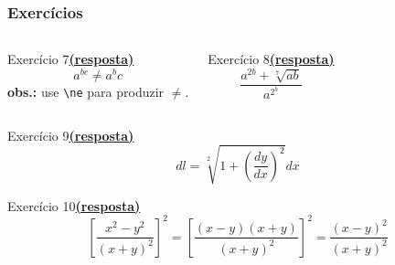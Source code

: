 \documentclass[handout,10pt]{beamer}
\begin{document}
\begin{frame}[fragile]
	\frametitle{Exercícios}

	\begin{columns}
		\begin{block}{Exercício 7\hyperlink{respostas1-8}{\footnotesize\textbf{(resposta)}}}
		\[a^{bc} \ne a^bc\]		
		\footnotesize\textbf{obs.:} use \verb|\ne| para produzir \(\ne\).
		\end{block}
		
		\begin{block}{Exercício 8\hyperlink{respostas1-8}{\footnotesize\textbf{(resposta)}}}
		\[\frac{a^{2b} + \sqrt[7]{ab}}{a^{2^b}}\]
		\end{block}		
	\end{columns}


	\begin{block}{Exercício 9\hyperlink{respostas9-13}{\footnotesize\textbf{(resposta)}}}
		\[
			dl = \sqrt[2]{1 + \left( \frac{dy}{dx} \right)^2} dx
		\]
	\end{block}
	
	
	\begin{block}{Exercício 10\hyperlink{respostas9-13}{\footnotesize\textbf{(resposta)}}}
		\[
			\left[ \frac{x^2 - y^2}{ \left( x + y \right)^2 } \right]^2 =
		  \left[ \frac{\left(x - y\right)\left(x + y\right)}{ \left( x + y \right)^2 } \right]^2 =
		  \frac{\left(x - y\right)^2}{ \left( x + y \right)^2 }
		\]%
	\end{block}

\end{frame}
\end{document}
